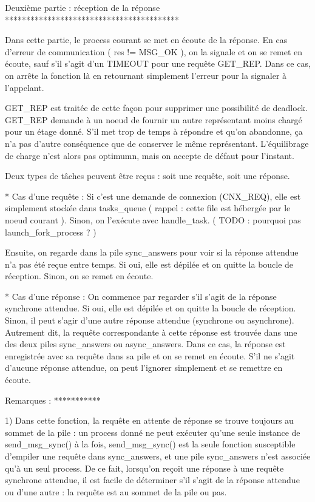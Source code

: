 Deuxième partie : réception de la réponse
*****************************************

Dans cette partie, le process courant se met en écoute de la réponse. En cas d'erreur de communication
( res != MSG_OK ), on la signale et on se remet en écoute, sauf s'il s'agit d'un TIMEOUT pour une
requête GET_REP. Dans ce cas, on arrête la fonction là en retournant simplement l'erreur pour la
signaler à l'appelant.

GET_REP est traitée de cette façon pour supprimer une possibilité de deadlock. GET_REP demande à un
noeud de fournir un autre représentant moins chargé pour un étage donné. S'il met trop de temps à
répondre et qu'on abandonne, ça n'a pas d'autre conséquence que de conserver le même représentant.
L'équilibrage de charge n'est alors pas optimumn, mais on accepte de défaut pour l'instant.

Deux types de tâches peuvent être reçus : soit une requête, soit une réponse.

* Cas d'une requête :
  Si c'est une demande de connexion (CNX_REQ), elle est simplement stockée dans tasks_queue (
  rappel : cette file est hébergée par le noeud courant ).
  Sinon, on l'exécute avec handle_task. ( TODO : pourquoi pas launch_fork_process ? )

  Ensuite, on regarde dans la pile sync_answers pour voir si la réponse attendue n'a pas été reçue
  entre temps. Si oui, elle est dépilée et on quitte la boucle de réception. Sinon, on se remet en
  écoute.

* Cas d'une réponse :
  On commence par regarder s'il s'agit de la réponse synchrone attendue. Si oui, elle est dépilée et
  on quitte la boucle de réception.
  Sinon, il peut s'agir d'une autre réponse attendue (synchrone ou asynchrone). Autrement dit, la
  requête correspondante à cette réponse est trouvée dans une des deux piles sync_answers ou
  async_answers.
  Dans ce cas, la réponse est enregistrée avec sa requête dans sa pile et on se remet en écoute.
  S'il ne s'agit d'aucune réponse attendue, on peut l'ignorer simplement et se remettre en écoute.

Remarques :
***********

1)
Dans cette fonction, la requête en attente de réponse se trouve toujours au sommet de la pile :
un process donné ne peut exécuter qu'une seule instance de send_msg_sync() à la fois, send_msg_sync()
est la seule fonction susceptible d'empiler une requête dans sync_answers, et une pile sync_answers
n'est associée qu'à un seul process.
De ce fait, lorsqu'on reçoit une réponse à une requête synchrone attendue, il est facile de déterminer
s'il s'agit de la réponse attendue ou d'une autre : la requête est au sommet de la pile ou pas.

